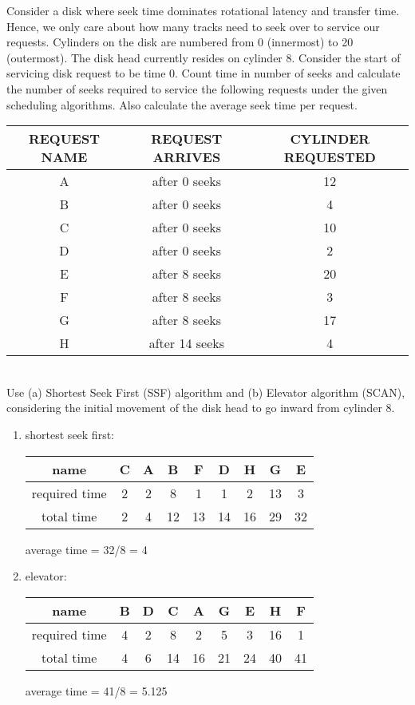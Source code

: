 \documentclass[12pt]{article}
\newenvironment{problem}[2][Problem]{\begin{trivlist}
\item[\hskip \labelsep {\bfseries #1}\hskip \labelsep {\bfseries #2.}]}{\end{trivlist}}
\begin{document}
\begin{problem}{7}
  Consider a disk where seek time dominates rotational latency and transfer
time. Hence, we only care about how many tracks need to seek over to service our requests.
Cylinders on the disk are numbered from 0 (innermost) to 20 (outermost). The disk head currently
resides on cylinder 8. Consider the start of servicing disk request to be time 0. Count time in
number of seeks and calculate the number of seeks required to service the following requests under
the given scheduling algorithms. Also calculate the average seek time per request.\\
\begin{tabular}[b]{|c|c|c|}
  \hline
  REQUEST NAME & REQUEST ARRIVES & CYLINDER REQUESTED\\
  \hline
  A & after 0 seeks & 12\\
  \hline
  B & after 0 seeks & 4\\
  \hline
  C & after 0 seeks & 10\\
  \hline
  D & after 0 seeks & 2\\
  \hline
  E & after 8 seeks & 20\\
  \hline
  F & after 8 seeks & 3\\
  \hline
  G & after 8 seeks & 17\\
  \hline
  H & after 14 seeks & 4\\
  \hline
\end{tabular}
\\Use (a) Shortest Seek First (SSF) algorithm and (b) Elevator algorithm (SCAN), considering
the initial movement of the disk head to go inward from cylinder 8.
  \begin{enumerate}[label=(\alph*)]
    \item shortest seek first:\\
    \begin{tabular}[b]{|c|c|c|c|c|c|c|c|c|}
      \hline
      name & C & A & B & F & D & H & G & E\\
      \hline
      required time & 2 & 2& 8 & 1 & 1 & 2 & 13 & 3\\
      \hline
      total time & 2 & 4 & 12 & 13 & 14 & 16 & 29 & 32\\
      \hline
    \end{tabular}
    average time = 32/8 = 4
    \item elevator:\\
    \begin{tabular}[b]{|c|c|c|c|c|c|c|c|c|}
      \hline
      name & B & D & C & A & G & E & H & F\\
      \hline
      required time & 4 & 2& 8 & 2 & 5 & 3 & 16 & 1\\
      \hline
      total time & 4 & 6 & 14 & 16 & 21 & 24 & 40 & 41\\
      \hline
    \end{tabular}
    average time = 41/8 = 5.125
  \end{enumerate}

\end{problem}

 
\end{document}
